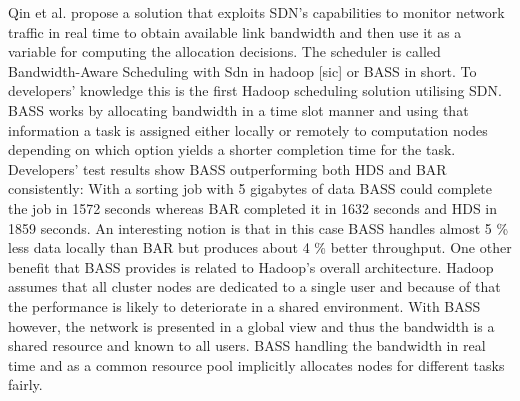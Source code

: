 \documentclass{acm_proc_article-sp}
\begin{document}
Qin et al. propose a solution that exploits SDN's capabilities to monitor network traffic in real time to obtain available link bandwidth and then use it as a variable for computing the allocation decisions. The scheduler is called Bandwidth-Aware Scheduling with Sdn in hadoop [sic] or BASS in short. To developers' knowledge this is the first Hadoop scheduling solution utilising SDN. BASS works by allocating bandwidth in a time slot manner and using that information a task is assigned either locally or remotely to computation nodes depending on which option yields a shorter completion time for the task. Developers' test results show BASS outperforming both HDS and BAR consistently: With a sorting job with 5 gigabytes of data BASS could complete the job in 1572 seconds whereas BAR completed it in 1632 seconds and HDS in 1859 seconds. An interesting notion is that in this case BASS handles almost 5 \% less data locally than BAR but produces about 4 \% better throughput. One other benefit that BASS provides is related to Hadoop's overall architecture. Hadoop assumes that all cluster nodes are dedicated to a single user and because of that the performance is likely to deteriorate in a shared environment. With BASS however, the network is presented in a global view and thus the bandwidth is a shared resource and known to all users. BASS handling the bandwidth in real time and as a common resource pool implicitly allocates nodes for different tasks fairly.
\end{document}
